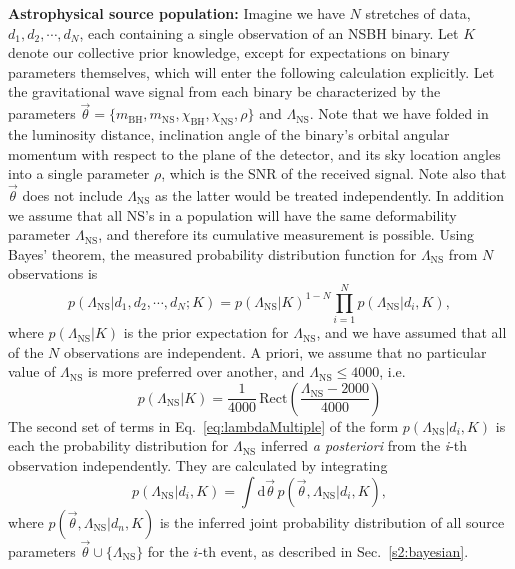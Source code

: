 \documentclass[aps,prd,amsmath,floats,floatfix, twocolumn,
superscriptaddress,nofootinbib,showpacs]{revtex4-1}
\newcommand{\D}{\mathrm{d}}
\newcommand{\lambdans}{\Lambda_\mathrm{NS}}
\newcommand{\chibh}{\chi_\mathrm{BH}}
\newcommand{\chins}{\chi_\mathrm{NS}}
\newcommand{\mbh}{m_\mathrm{BH}}
\newcommand{\mns}{m_\mathrm{NS}}
\begin{document}
\textbf{Astrophysical source population: }\label{s2:astro_multiple}
% 
Imagine we have $N$ stretches of data,
$d_1, d_2, \cdots, d_N$, each containing a single observation of an NSBH binary. Let $K$
denote our collective prior knowledge, except for expectations on binary parameters
themselves, which will enter the following calculation explicitly. Let the gravitational wave
signal from each binary be characterized by the parameters 
$\vec{\theta} = \{\mbh, \mns, \chibh, \chins, \rho\}$ and $\lambdans$. Note that we have folded
in the luminosity distance, inclination angle of the binary's orbital angular momentum with
respect to the plane of the detector, and its sky location angles into a single parameter $\rho$,
which is the SNR of the received signal. Note also that $\vec{\theta}$ does not include
$\lambdans$ as the latter would be treated independently. In addition we assume that all
NS's in a population will have the same deformability parameter $\lambdans$, and therefore
its cumulative measurement is possible.
% 
Using Bayes' theorem, the measured probability distribution function for $\lambdans$
from $N$ observations is
\begin{equation}\label{eq:lambdaMultiple}
 p(\lambdans | d_1, d_2, \cdots, d_N; K) = p(\lambdans | K)^{1-N}\prod_{i=1}^N p(\lambdans | d_i, K),
\end{equation}
where $p(\lambdans|K)$ is the prior expectation for $\lambdans$, and we have assumed
that all of the $N$ observations are independent. A priori, we assume that no 
particular value of $\lambdans$ is more preferred over another, and $\lambdans\leq 4000$,
i.e.
\begin{equation}\label{eq:lprior}
 p(\lambdans | K) = \dfrac{1}{4000}\,\mathrm{Rect}\left(\frac{\lambdans-2000}{4000}\right)
\end{equation}
% 
The second set of terms in Eq.~\ref{eq:lambdaMultiple} of the form $p(\lambdans | d_i, K)$
is each the probability distribution for $\lambdans$ inferred {\it a posteriori} from
the \textit{i}-th observation independently. 
They are calculated by integrating
\begin{equation}
 p(\lambdans | d_i, K) = \int \D \vec{\theta}\, p(\vec{\theta}, \lambdans | d_i, K),
\end{equation}
where $p(\vec{\theta}, \lambdans | d_n, K)$ is the inferred joint probability 
distribution of all source parameters $\vec{\theta}\cup\{\lambdans\}$ for the 
$i$-th event, as described in Sec.~\ref{s2:bayesian}.
\end{document}
